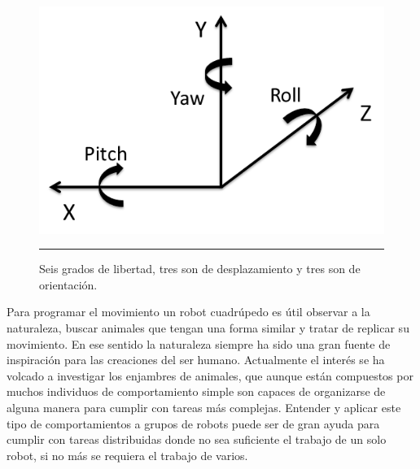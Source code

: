 \begin{figure}[htbp]
	\centering
		\includegraphics[width=\textwidth]{./Figures/6DOF.png}
		\rule{35em}{0.5pt}
	\caption[Grados de libertad]{Seis grados de libertad, tres son de desplazamiento y tres son de orientación.}
	\label{fig:grados de libertad}
\end{figure}

Para programar el movimiento un robot cuadrúpedo es útil observar a la naturaleza, buscar animales que tengan una forma similar y tratar de replicar su movimiento. En ese sentido la naturaleza siempre ha sido una gran fuente de inspiración para las creaciones del ser humano. Actualmente el interés se ha volcado a investigar los enjambres de animales, que aunque están compuestos por muchos individuos de comportamiento simple son capaces de organizarse de alguna manera para cumplir con tareas más complejas. Entender y aplicar este tipo de comportamientos a grupos de robots puede ser de gran ayuda para cumplir con tareas distribuidas donde no sea suficiente el trabajo de un solo robot, si no más se requiera el trabajo de varios.


